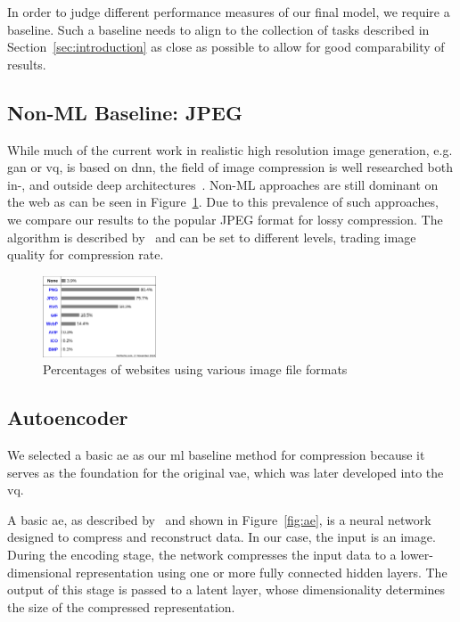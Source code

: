In order to judge different performance measures of our final model, we require a baseline.
Such a baseline needs to align to the collection of tasks described in Section~\ref{sec:introduction} as close as
possible to allow for good comparability of results.

\subsection{Non-ML Baseline: JPEG}\label{subsec:jpeg}
While much of the current work in realistic high resolution image generation, e.g. \ac{gan} or \ac{vq}, is based on
\ac{dnn}, the field of image compression is well researched both in-, and outside deep architectures~\cite{compression}.
Non-ML approaches are still dominant on the web as can be seen in Figure~\ref{fig:file_formats}.
Due to this prevalence of such approaches, we compare our results to the popular JPEG format for lossy compression.
The algorithm is described by~\cite{jpeg} and can be set to different levels, trading image quality for compression
rate.

\begin{figure}[H]
    \centering
    \includegraphics[width=0.3\textwidth]{images/formats}
    \caption{Percentages of websites using various image file formats~\cite{img_file_format}}
    \label{fig:file_formats}
\end{figure}

\subsection{Autoencoder}\label{subsec:autoencoder}
We selected a basic \ac{ae} as our \ac{ml} baseline method for compression because it serves as the foundation
for the original \ac{vae}, which was later developed into the \ac{vq}.

A basic \ac{ae}, as described by~\cite{autoenc} and shown in Figure~\ref{fig:ae}, is a neural network designed to compress and reconstruct data. In our case, the input is an image. During the encoding stage, the network compresses the input data to a lower-dimensional representation using one or more fully connected hidden layers.
The output of this stage is passed to a latent layer, whose dimensionality determines the size of the compressed representation.

